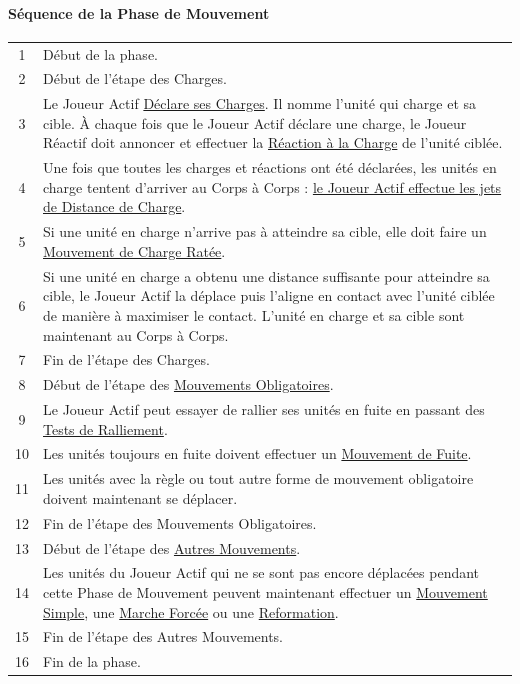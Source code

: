 {\begin{minipage}[t]{.35\linewidth}
\end{minipage}\hfill\begin{minipage}[t]{.60\linewidth}

\paragraph{Séquence de la Phase de Mouvement}

\begin{tabular}{c|p{9.6cm}}
1 & Début de la phase. \tabularnewline
2 & Début de l'étape des Charges. \tabularnewline
3 & Le Joueur Actif \hyperlink{declarecharges}{Déclare ses Charges}. Il nomme l'unité qui charge et sa cible. À chaque fois que le Joueur Actif déclare une charge, le Joueur Réactif doit annoncer et effectuer la \hyperlink{chargereaction}{Réaction à la Charge} de l'unité ciblée. \tabularnewline
4 & Une fois que toutes les charges et réactions ont été déclarées, les unités en charge tentent d'arriver au Corps à Corps : \hyperlink{movechargers}{le Joueur Actif effectue les jets de Distance de Charge}. \tabularnewline
5 & Si une unité en charge n'arrive pas à atteindre sa cible, elle doit faire un \hyperlink{failedchargemove}{Mouvement de Charge Ratée}. \tabularnewline
6 & Si une unité en charge a obtenu une distance suffisante pour atteindre sa cible, le Joueur Actif la déplace puis l'aligne en contact avec l'unité ciblée de manière à maximiser le contact. L'unité en charge et sa cible sont maintenant au Corps à Corps. \tabularnewline
7 & Fin de l'étape des Charges. \tabularnewline
8 & Début de l'étape des \hyperlink{compulsorymoves}{Mouvements Obligatoires}. \tabularnewline
9 & Le Joueur Actif peut essayer de rallier ses unités en fuite en passant des \hyperlink{rallytest}{Tests de Ralliement}. \tabularnewline
10 & Les unités toujours en fuite doivent effectuer un \hyperlink{fleemove}{Mouvement de Fuite}. \tabularnewline
11 & Les unités avec la règle \hyperlink{randommovement}{\randommovement{}} ou tout autre forme de mouvement obligatoire doivent maintenant se déplacer. \tabularnewline
12 & Fin de l'étape des Mouvements Obligatoires. \tabularnewline
13 & Début de l'étape des \hyperlink{remainingmoves}{Autres Mouvements}. \tabularnewline
14 & Les unités du Joueur Actif qui ne se sont pas encore déplacées pendant cette Phase de Mouvement peuvent maintenant effectuer un \hyperlink{advancemove}{Mouvement Simple}, une \hyperlink{marchmove}{Marche Forcée} ou une \hyperlink{reform}{Reformation}. \tabularnewline
15 & Fin de l'étape des Autres Mouvements. \tabularnewline
16 & Fin de la phase. \tabularnewline
\end{tabular}


\end{minipage}}
